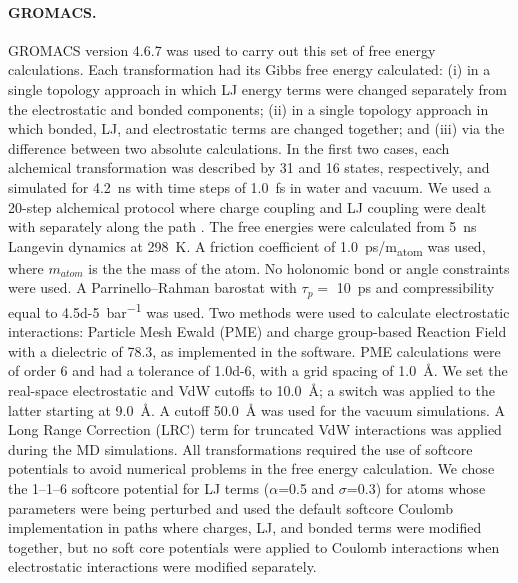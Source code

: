 \documentclass[journal=jctcce,manuscript=article]{achemso}
\begin{document}
\paragraph{GROMACS.}
GROMACS version 4.6.7 was used to carry out this set of free energy calculations.
%
Each transformation had its Gibbs free energy calculated:
(i) in a single topology approach in which LJ energy terms were changed separately from the electrostatic and bonded components;
(ii) in a single topology approach in which bonded, LJ, and electrostatic terms are changed together; and
(iii) via the difference between two absolute calculations.
In the first two cases, each alchemical transformation was described by 31 and 16 states, respectively, and simulated for \SI{4.2}{ns} with time steps of \SI{1.0}{fs} in water and vacuum.
We used a 20-step alchemical protocol where charge coupling and LJ coupling were dealt with separately along the path \cite{Mobley2014, doi:10.1021/acs.jced.7b00104}.
%
The free energies were calculated from \SI{5}{ns} Langevin dynamics at \SI{298}{K}.
A friction coefficient of \SI{1.0}{ps/m_{atom}} was used, where $m_{atom}$ is the the mass of the atom.
No holonomic bond or angle constraints were used.
A Parrinello--Rahman barostat with $\tau_p =$ \SI{10}{ps} and compressibility equal to \SI{4.5d-5}{bar^{-1}} was used.
%
Two methods were used to calculate electrostatic interactions:
Particle Mesh Ewald (PME) and charge group-based Reaction Field with a dielectric of 78.3, as implemented in the software.
PME calculations were of order 6 and had a tolerance of \num{1.0d-6}, with a grid spacing of \SI{1.0}{\angstrom}.
We set the real-space electrostatic and VdW cutoffs to \SI{10.0}{\angstrom}; a switch was applied to the latter starting at \SI{9.0}{\angstrom}.
A cutoff \SI{50.0}{\angstrom} was used for the vacuum simulations.
%
A Long Range Correction (LRC) term for truncated VdW interactions was applied during the MD simulations.
%
All transformations required the use of softcore potentials to avoid numerical problems in the free energy calculation.
We chose the 1--1--6 softcore potential for LJ terms ($\alpha$=0.5 and $\sigma$=0.3) for atoms whose parameters were being perturbed
and used the default softcore Coulomb implementation in paths where charges, LJ, and bonded terms were modified together,
but no soft core potentials were applied to Coulomb interactions when electrostatic interactions were modified separately.
\end{document}
